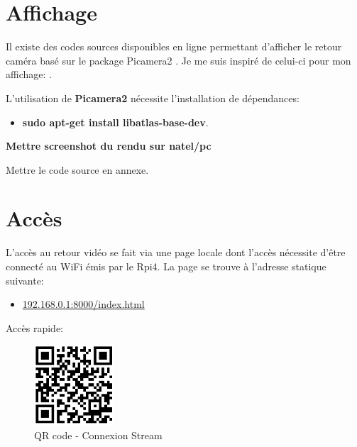 \section{Affichage}
Il existe des codes sources disponibles en ligne permettant d'afficher le retour caméra basé sur le package Picamera2 \cite{picamera2}.
Je me suis inspiré de celui-ci pour mon affichage: \cite{code_camera}.

L'utilisation de \textbf{Picamera2} nécessite l'installation de dépendances:
\begin{itemize}
    \item \textbf{sudo apt-get install libatlas-base-dev}.
\end{itemize}
\textbf{Mettre screenshot du rendu sur natel/pc}

Mettre le code source en annexe.
\section{Accès}
L'accès au retour vidéo se fait via une page locale dont l'accès nécessite d'être connecté au WiFi émis par le Rpi4.
La page se trouve à l'adresse statique suivante:
\begin{itemize}
    \item  \url{192.168.0.1:8000/index.html}
\end{itemize}
Accès rapide:

\begin{figure}[H]
    \centering
    \includegraphics[width=3cm]{assets/figures/acces_stream.PNG}
    \caption{QR code - Connexion Stream}
\end{figure}